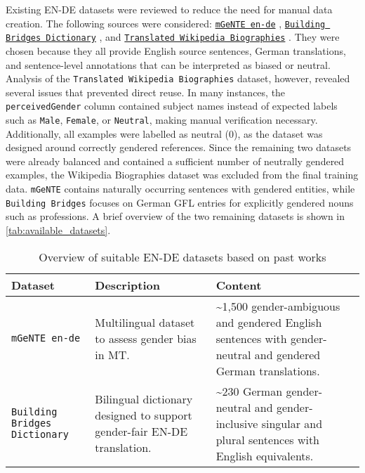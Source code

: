     Existing EN-DE datasets were reviewed to reduce the need for manual data creation. The following sources were considered: \texttt{\href{https://huggingface.co/datasets/FBK-MT/mGeNTE}{mGeNTE en-de}} \parencite{savoldiMGeNTEMultilingualResource2025}, \texttt{\href{https://github.com/g8a9/building-bridges-gender-fair-german-mt}{Building Bridges Dictionary}} \parencite{lardelliBuildingBridgesDataset2024}, and \texttt{\href{https://research.google/blog/a-dataset-for-studying-gender-bias-in-translation/}{Translated Wikipedia Biographies}} \parencite{stellaDatasetStudyingGender2021}. They were chosen because they all provide English source sentences, German translations, and sentence-level annotations that can be interpreted as biased or neutral. Analysis of the \texttt{Translated Wikipedia Biographies} dataset, however, revealed several issues that prevented direct reuse. In many instances, the \texttt{perceivedGender} column contained subject names instead of expected labels such as \texttt{Male}, \texttt{Female}, or \texttt{Neutral}, making manual verification necessary. Additionally, all examples were labelled as neutral (0), as the dataset was designed around correctly gendered references. Since the remaining two datasets were already balanced and contained a sufficient number of neutrally gendered examples, the Wikipedia Biographies dataset was excluded from the final training data. \texttt{mGeNTE} contains naturally occurring sentences with gendered entities, while \texttt{Building Bridges} focuses on German GFL entries for explicitly gendered nouns such as professions. A brief overview of the two remaining datasets is shown in \autoref{tab:available_datasets}.

\vspace{0.8em}
\begin{table}[ht!]
    \centering
    \renewcommand{\arraystretch}{1.3}
    \begin{tabularx}{\textwidth}{|>{\raggedright\arraybackslash}X|>{\raggedright\arraybackslash}X|>{\raggedright\arraybackslash}X|}
    \hline
    \textbf{Dataset} & \textbf{Description} & \textbf{Content} \\ \hline
    \texttt{mGeNTE en-de} \parencite{savoldiMGeNTEMultilingualResource2025} & Multilingual dataset to assess gender bias in MT. & \textasciitilde1,500 gender-ambiguous and gendered English sentences with gender-neutral and gendered German translations. \\ \hline
    \texttt{Building Bridges Dictionary} \parencite{lardelliBuildingBridgesDataset2024} & Bilingual dictionary designed to support gender-fair EN-DE translation. & \textasciitilde230 German gender-neutral and gender-inclusive singular and plural sentences with English equivalents. \\ \hline
    \end{tabularx}
    \caption{Overview of suitable EN-DE datasets based on past works}
    \label{tab:available_datasets}
\end{table}

